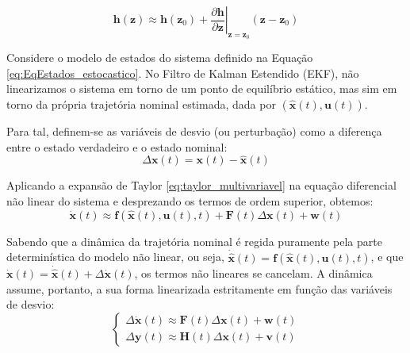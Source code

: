 \documentclass[a4paper,12pt]{article}
\begin{document}
\begin{equation}
    \mathbf{h}(\mathbf{z}) \approx \mathbf{h}(\mathbf{z}_0) + \left. \frac{\partial \mathbf{h}}{\partial \mathbf{z}} \right|_{\mathbf{z}=\mathbf{z}_0} (\mathbf{z} - \mathbf{z}_0)
    \label{eq:taylor_multivariavel}
\end{equation}

Considere o modelo de estados do sistema definido na Equação \eqref{eq:EqEstados_estocastico}. No Filtro de Kalman Estendido (EKF), não linearizamos o sistema em torno de um ponto de equilíbrio estático, mas sim em torno da própria trajetória nominal estimada, dada por $(\hat{\mathbf{x}}(t), \mathbf{u}(t))$. 

Para tal, definem-se as variáveis de desvio (ou perturbação) como a diferença entre o estado verdadeiro e o estado nominal:
\begin{equation}
    \Delta\mathbf{x}(t) = \mathbf{x}(t) - \hat{\mathbf{x}}(t)
\end{equation}

Aplicando a expansão de Taylor \eqref{eq:taylor_multivariavel} na equação diferencial não linear do sistema e desprezando os termos de ordem superior, obtemos:
\begin{equation}
    \dot{\mathbf{x}}(t) \approx \mathbf{f}(\hat{\mathbf{x}}(t), \mathbf{u}(t), t) + \mathbf{F}(t)\Delta\mathbf{x}(t) + \mathbf{w}(t)
\end{equation}

Sabendo que a dinâmica da trajetória nominal é regida puramente pela parte determinística do modelo não linear, ou seja, $\dot{\hat{\mathbf{x}}}(t) = \mathbf{f}(\hat{\mathbf{x}}(t), \mathbf{u}(t), t)$, e que $\dot{\mathbf{x}}(t) = \dot{\hat{\mathbf{x}}}(t) + \Delta\dot{\mathbf{x}}(t)$, os termos não lineares se cancelam. A dinâmica assume, portanto, a sua forma linearizada estritamente em função das variáveis de desvio:
\begin{equation}
    \begin{cases}
        \Delta\dot{\mathbf{x}}(t) \approx \mathbf{F}(t)\Delta\mathbf{x}(t) + \mathbf{w}(t) \\
        \Delta\mathbf{y}(t) \approx \mathbf{H}(t)\Delta\mathbf{x}(t) + \mathbf{v}(t)
    \end{cases}
    \label{eq:dinamica_linearizada_total}
\end{equation}
\end{document}
